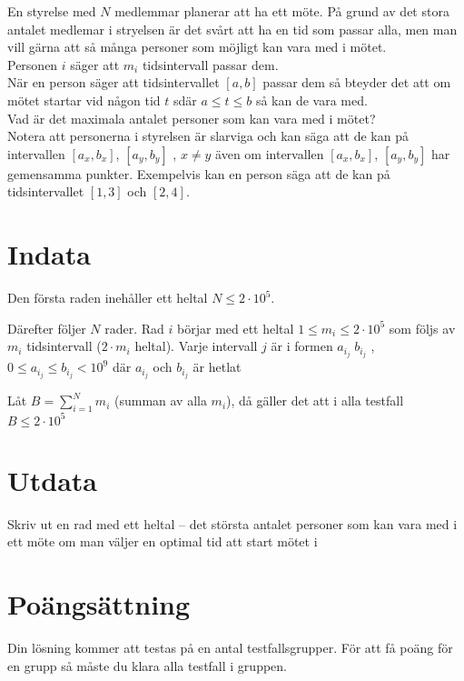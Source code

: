\documentclass[a4paper,12pt,oneside]{amsbook}
\theoremstyle{test}
\begin{document}



En styrelse med $N$ medlemmar planerar att ha ett möte. På grund av det stora antalet medlemar i stryelsen är det svårt att ha en tid som passar alla, men man vill gärna att så många personer som möjligt kan vara med i mötet.\\ Personen $i$ säger att $m_i$ tidsintervall passar dem.\\
När en person säger att tidsintervallet $[a,b]$ passar dem så bteyder det att om mötet startar vid någon tid $t$ sdär $a\leq t \leq b$ så kan de vara med.\\
Vad är det maximala antalet personer som kan vara med i mötet?\\
Notera att personerna i styrelsen är slarviga och kan säga att de kan på intervallen $[a_x,b_x]$, $[a_y,b_y]$ , $x \neq y$ även om intervallen $[a_x,b_x]$, $[a_y,b_y]$ har gemensamma punkter. Exempelvis kan en person säga att de kan på tidsintervallet $[1,3]$ och $[2,4]$.
\section*{Indata}
Den första raden inehåller ett heltal $N \leq 2\cdot 10^5$.

Därefter följer $N$ rader. Rad $i$ börjar med ett heltal $1 \leq m_i \leq 2\cdot 10^5 $ som följs av $m_i$ tidsintervall ($2 \cdot m_i$ heltal). Varje intervall $j$ är i formen $a_i_j\; b_i_j$ , $0\leq a_i_j\leq b_i_j<10^9$ där $a_i_j$ och  $b_i_j$ är hetlat 

Låt $B=\sum_{i=1}^{N} m_i$ (summan av alla $m_i$), då gäller det att i alla testfall $B \leq 2\cdot 10^5$

\section*{Utdata}
Skriv ut en rad med ett heltal -- det största antalet personer som kan vara med i ett möte om man väljer en optimal tid att start mötet i

\section*{Poängsättning}
Din lösning kommer att testas på en antal testfallsgrupper.
För att få poäng för en grupp så måste du klara alla testfall i gruppen.
\end{document}
